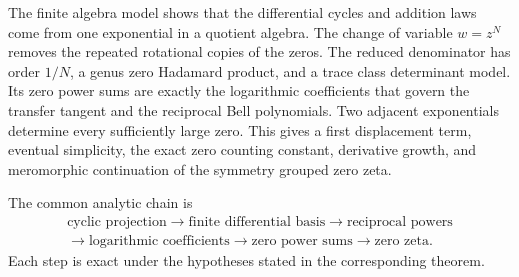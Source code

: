 \documentclass{aomart}
\theoremstyle{definition}
\theoremstyle{remark}
\begin{document}
The finite algebra model shows that the differential cycles and addition laws come from one exponential in a quotient algebra.  The change of variable $w=z^N$ removes the repeated rotational copies of the zeros.  The reduced denominator has order $1/N$, a genus zero Hadamard product, and a trace class determinant model.  Its zero power sums are exactly the logarithmic coefficients that govern the transfer tangent and the reciprocal Bell polynomials.  Two adjacent exponentials determine every sufficiently large zero.  This gives a first displacement term, eventual simplicity, the exact zero counting constant, derivative growth, and meromorphic continuation of the symmetry grouped zero zeta.

The common analytic chain is
\[
\begin{gathered}
\text{cyclic projection}
\longrightarrow
\text{finite differential basis}
\longrightarrow
\text{reciprocal powers}
\\
\longrightarrow
\text{logarithmic coefficients}
\longrightarrow
\text{zero power sums}
\longrightarrow
\text{zero zeta}.
\end{gathered}
\]
Each step is exact under the hypotheses stated in the corresponding theorem.




\end{document}
